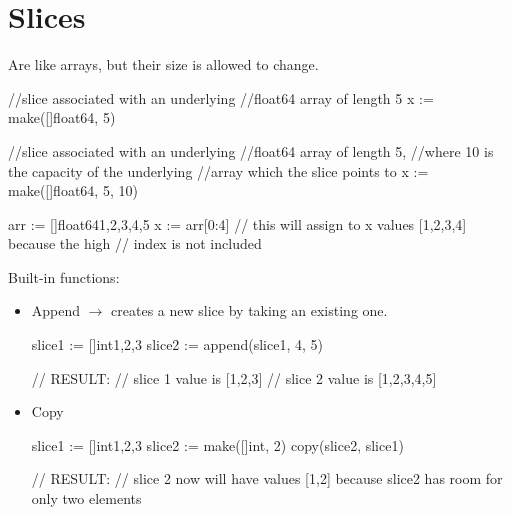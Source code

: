\documentclass[twoside,a4paper,english]{report}
\begin{document}
\section{Slices}
Are like arrays, but their size is allowed to change.\\
\begin{go}
//slice associated with an underlying
//float64 array of length 5
x := make([]float64, 5)

//slice associated with an underlying
//float64 array of length 5,
//where 10 is the capacity of the underlying
//array which the slice points to
x := make([]float64, 5, 10)

arr := []float64{1,2,3,4,5}
x := arr[0:4] // this will assign to x values [1,2,3,4] because the high 
              // index is not included
\end{go}
Built-in functions:\\
\begin{itemize}
\item Append $\rightarrow$ creates a new slice by taking an existing one.
\begin{go}
slice1 := []int{1,2,3}
slice2 := append(slice1, 4, 5)  

// RESULT:
// slice 1 value is [1,2,3]
// slice 2 value is [1,2,3,4,5]
\end{go} 
\item Copy
\begin{go}
slice1 := []int{1,2,3}
slice2 := make([]int, 2)
copy(slice2, slice1)

// RESULT:
// slice 2 now will have values [1,2] because slice2 has room for only two elements
\end{go}
\end{itemize}
\end{document}

